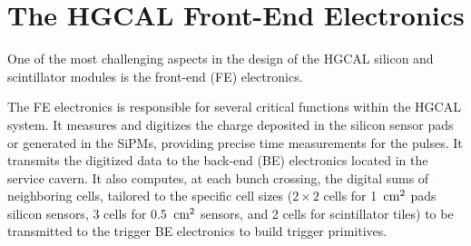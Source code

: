 
\section{The HGCAL Front-End Electronics}
\label{sec:The HGCAL Front-End Electronics}

One of the most challenging aspects in the design of the HGCAL silicon and scintillator modules is the front-end (FE) electronics. 

The FE electronics is responsible for several critical functions within the HGCAL system. It measures and digitizes the charge deposited in the silicon sensor pads or generated in the SiPMs, providing precise time measurements for the pulses. It transmits the digitized data to the back-end (BE) electronics located in the service cavern. It also computes, at each bunch crossing, the digital sums of neighboring cells, tailored to the specific cell sizes ($2\times2$ cells for 1~$\textnormal{cm}^2$ pads silicon sensors, 3 cells for 0.5~$\textnormal{cm}^2$ sensors, and 2 cells for scintillator tiles) to be transmitted to the trigger BE electronics to build trigger primitives.

